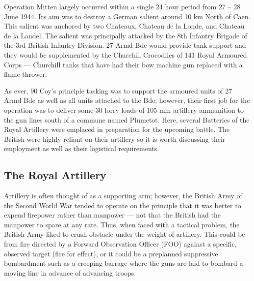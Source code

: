 \documentclass[noraggedright]{turabian-researchpaper}
\begin{document}
Operation Mitten largely occurred within a single 24 hour period from 27 -- 
28 June 1944.  Its aim was to destroy a German salient around 10 km North of 
Caen.  This salient was anchored by two Chateaux, Chateau de la Londe, and 
Chateau de la Landel.  The salient was principally attacked by the 8th 
Infantry Brigade of the 3rd British Infantry Division.  27 Armd Bde would 
provide tank support and they would be supplemented by the Churchill 
Crocodiles of 141 Royal Armoured Corps --- Churchill tanks that have had 
their bow machine gun replaced with a flame-thrower.

As ever, 90 Coy's principle tasking was to support the armoured units of 27
Armd Bde as well as all units attached to the Bde; however, their first job 
for the operation was to deliver some 30 lorry loads of 105 mm artillery 
ammunition to the gun lines 
south of a commune named Plumetot.\autocite[26 June 1944]{90wd}
Here, several Batteries of the Royal Artillery were emplaced in preparation 
for the upcoming battle.  The British were highly reliant on their artillery 
so it is worth discussing their employment as well as their logistical 
requirements.

	\subsection{The Royal Artillery} %

Artillery is often thought of as a supporting arm; however, the British Army 
of the Second World War tended to operate on the principle that it was better 
to expend firepower rather than manpower --- not that the British had 
the manpower to spare at any rate.  Thus, when faced with a 
tactical problem, the British Army liked to crush
obstacle under the weight of artillery. %
This could be from fire directed by a Forward Observation Officer (FOO) 
against a specific, observed target (fire for effect), or it 
could be a preplanned suppressive bombardment such as a creeping barrage where 
the guns are laid to bombard a moving line in advance of advancing 
troops.\autocite[130-1, 136]{gunfire}
\end{document}
